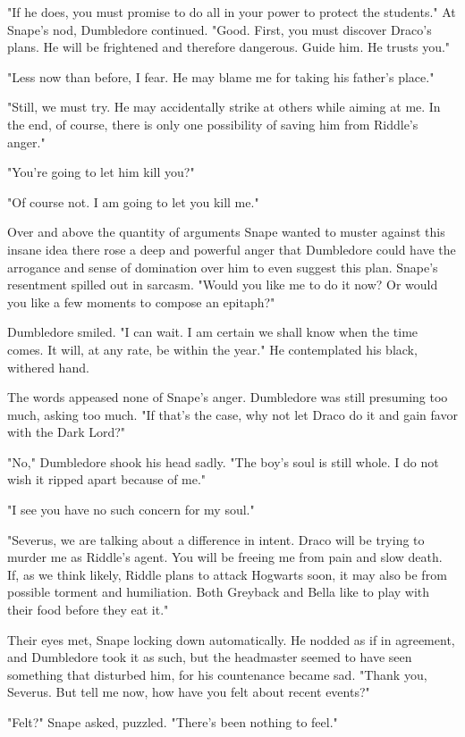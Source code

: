 \documentclass[a4paper,11pt]{article}
\begin{document}
"If he does, you must promise to do all in your power to protect the students." At Snape's nod, Dumbledore continued. "Good. First, you must discover Draco's plans. He will be frightened and therefore dangerous. Guide him. He trusts you."

"Less now than before, I fear. He may blame me for taking his father's place."

"Still, we must try. He may accidentally strike at others while aiming at me. In the end, of course, there is only one possibility of saving him from Riddle's anger."

"You're going to let him kill you?"

"Of course not. I am going to let you kill me."

Over and above the quantity of arguments Snape wanted to muster against this insane idea there rose a deep and powerful anger that Dumbledore could have the arrogance and sense of domination over him to even suggest this plan. Snape's resentment spilled out in sarcasm. "Would you like me to do it now? Or would you like a few moments to compose an epitaph?"

Dumbledore smiled. "I can wait. I am certain we shall know when the time comes. It will, at any rate, be within the year." He contemplated his black, withered hand.

The words appeased none of Snape's anger. Dumbledore was still presuming too much, asking too much. "If that's the case, why not let Draco do it and gain favor with the Dark Lord?"

"No," Dumbledore shook his head sadly. "The boy's soul is still whole. I do not wish it ripped apart because of me."

"I see you have no such concern for my soul."

"Severus, we are talking about a difference in intent. Draco will be trying to murder me as Riddle's agent. You will be freeing me from pain and slow death. If, as we think likely, Riddle plans to attack Hogwarts soon, it may also be from possible torment and humiliation. Both Greyback and Bella like to play with their food before they eat it."

Their eyes met, Snape locking down automatically. He nodded as if in agreement, and Dumbledore took it as such, but the headmaster seemed to have seen something that disturbed him, for his countenance became sad. "Thank you, Severus. But tell me now, how have you felt about recent events?"

"Felt?" Snape asked, puzzled. "There's been nothing to feel."
\end{document}
